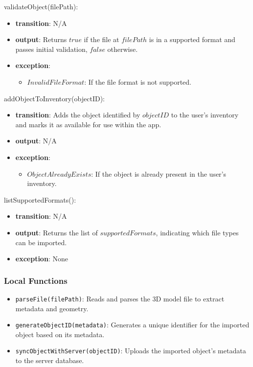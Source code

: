 \documentclass[12pt, titlepage]{article}
\begin{document}
\noindent validateObject(filePath):
\begin{itemize}
  \item \textbf{transition}: N/A
  \item \textbf{output}:
        Returns \( true \) if the file at \( filePath \) is in a supported format and passes initial validation, \( false \) otherwise.
  \item \textbf{exception}:
        \begin{itemize}
          \item \( InvalidFileFormat \): If the file format is not supported.
        \end{itemize}
\end{itemize}

\noindent addObjectToInventory(objectID):
\begin{itemize}
  \item \textbf{transition}:
        Adds the object identified by \( objectID \) to the user's inventory and marks it as available for use within the app.
  \item \textbf{output}: N/A
  \item \textbf{exception}:
        \begin{itemize}
          \item \( ObjectAlreadyExists \): If the object is already present in the user's inventory.
        \end{itemize}
\end{itemize}

\noindent listSupportedFormats():
\begin{itemize}
  \item \textbf{transition}: N/A
  \item \textbf{output}:
        Returns the list of \( supportedFormats \), indicating which file types can be imported.
  \item \textbf{exception}: None
\end{itemize}

\subsubsection{Local Functions}

\begin{itemize}
  \item \texttt{parseFile(filePath)}: Reads and parses the 3D model file to extract metadata and geometry.
  \item \texttt{generateObjectID(metadata)}: Generates a unique identifier for the imported object based on its metadata.
  \item \texttt{syncObjectWithServer(objectID)}: Uploads the imported object’s metadata to the server database.
\end{itemize}
\end{document}
